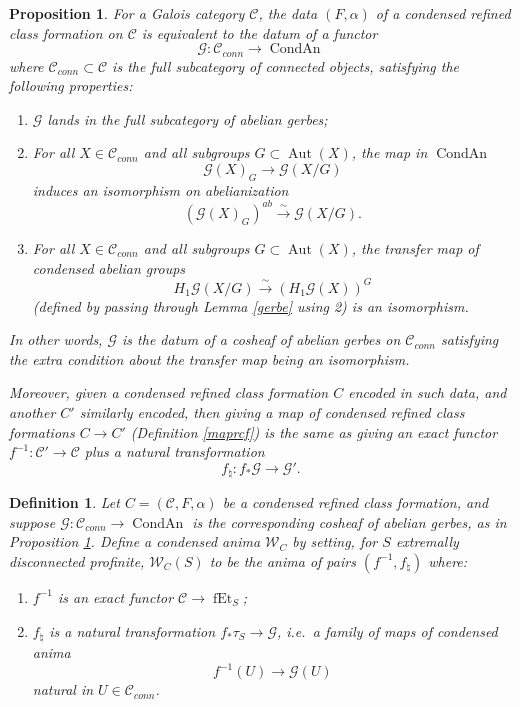 \documentclass[10pt,a4paper]{amsart}
\newtheorem{definition}{Definition}
\newtheorem{proposition}{Proposition}
\newcommand{\mc}{\mathcal}
\newcommand{\on}{\operatorname}
\begin{document}
\begin{proposition}\label{rcfgerbe}
For a Galois category $\mc{C}$, the data $(F,\alpha)$ of a condensed refined class formation on $\mc{C}$ is equivalent to the datum of a functor
$$\mc{G}:\mc{C}_{conn}\to\on{CondAn}$$
where $\mc{C}_{conn}\subset\mc{C}$ is the full subcategory of connected objects, satisfying the following properties:
\begin{enumerate}
\item $\mc{G}$ lands in the full subcategory of abelian gerbes;
\item For all $X\in\mc{C}_{conn}$ and all subgroups $G\subset\on{Aut}(X)$, the map in $\on{CondAn}$
$$\mc{G}(X)_G \to \mc{G}(X/G)$$
induces an isomorphism on abelianization
$$(\mc{G}(X)_G)^{ab} \overset{\sim}{\rightarrow} \mc{G}(X/G).$$
\item For all $X\in\mc{C}_{conn}$ and all subgroups $G\subset\on{Aut}(X)$, the transfer map of condensed abelian groups
$$H_1\mc{G}(X/G)\overset{\sim}{\rightarrow} \left(H_1\mc{G}(X)\right)^G$$
(defined by passing through Lemma \ref{gerbe} using 2) is an isomorphism.
\end{enumerate}
In other words, $\mc{G}$ is the datum of a cosheaf of abelian gerbes on $\mc{C}_{conn}$ satisfying the extra condition about the transfer map being an isomorphism.

Moreover, given a condensed refined class formation $C$ encoded in such data, and another $C'$ similarly encoded, then giving a map of condensed refined class formations $C \to C'$ (Definition \ref{maprcf}) is the same as giving an exact functor $f^{-1}:\mc{C}'\to\mc{C}$ plus a natural transformation
$$f_\natural: f_\ast\mc{G} \to \mc{G}'.$$
\end{proposition}

\begin{definition}\label{rcftocond}
Let $C=(\mc{C},F,\alpha)$ be a condensed refined class formation, and suppose $\mc{G}:\mc{C}_{conn}\to\on{CondAn}$ is the corresponding cosheaf of abelian gerbes, as in Proposition \ref{rcfgerbe}.  Define a condensed anima $\mathcal{W}_C$ by setting, for $S$ extremally disconnected profinite, $\mathcal{W}_C(S)$ to be the anima of pairs $(f^{-1},f_\natural)$ where:
\begin{enumerate}
\item $f^{-1}$ is an exact functor $\mc{C} \to \on{fEt}_S$;
\item $f_\natural$ is a natural transformation $f_\ast \tau_S \to \mc{G}$, i.e.\ a family of maps of condensed anima
$$f^{-1}(U)\to \mc{G}(U)$$
natural in $U\in\mc{C}_{conn}$.
\end{enumerate}
\end{definition}
\end{document}
